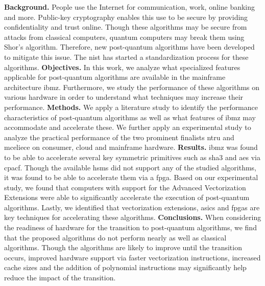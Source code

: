 \abstract
\noindent\textbf{Background.} People use the Internet for communication, work, online banking and more. Public-key cryptography enables this use to be secure by providing confidentiality and trust online. Though these algorithms may be secure from attacks from classical computers, quantum computers may break them using Shor's algorithm. Therefore, new \gls{post-quantum} algorithms have been developed to mitigate this issue. The \acrlong{nist} has started a standardization process for these algorithms.\newline
\textbf{Objectives.} In this work, we analyze what specialized features applicable for \gls{post-quantum} algorithms are available in the mainframe architecture \gls{ibmz}. Furthermore, we study the performance of these algorithms on various hardware in order to understand what techniques may increase their performance.\newline
\textbf{Methods.} We apply a literature study to identify the performance characteristics of \gls{post-quantum} algorithms as well as what features of \gls{ibmz} may accommodate and accelerate these. We further apply an experimental study to analyze the practical performance of the two prominent finalists \gls{ntru} and \gls{mceliece} on consumer, cloud and mainframe hardware.\newline
\textbf{Results.} \gls{ibmz} was found to be able to accelerate several key symmetric primitives such as \gls{sha3} and \gls{aes} via \gls{cpacf}. Though the available \acrlong{hsm}s did not support any of the studied algorithms, it was found to be able to accelerate them via a \gls{fpga}. Based on our experimental study, we found that computers with support for the Advanced Vectorization Extensions were able to significantly accelerate the execution of \gls{post-quantum} algorithms. Lastly, we identified that vectorization extensions, \glspl{asic} and \glspl{fpga} are key techniques for accelerating these algorithms.\newline
\textbf{Conclusions.} When considering the readiness of hardware for the transition to \gls{post-quantum} algorithms, we find that the proposed algorithms do not perform nearly as well as classical algorithms. Though the algorithms are likely to improve until the transition occurs, improved hardware support via faster vectorization instructions, increased cache sizes and the addition of polynomial instructions may significantly help reduce the impact of the transition.

